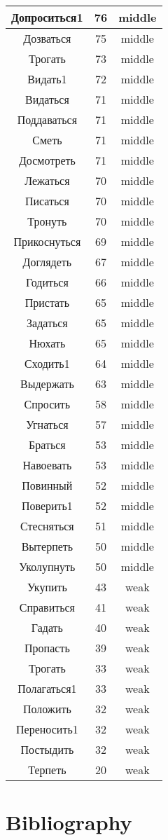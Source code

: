 \documentclass[a4paper,12pt]{article}
\begin{document}
\begin{longtable}{|c|c|c|}
		Допроситься1 & 76 & middle \\ \hline
		Дозваться & 75 & middle \\ \hline
		Трогать & 73 & middle \\ \hline
		Видать1 & 72 & middle \\ \hline
		Видаться & 71 & middle \\ \hline
		Поддаваться & 71 & middle \\ \hline
		Сметь & 71 & middle \\ \hline
		Досмотреть & 71 & middle \\ \hline
		Лежаться & 70 & middle \\ \hline
		Писаться & 70 & middle \\ \hline
		Тронуть & 70 & middle \\ \hline
		Прикоснуться & 69 & middle \\ \hline
		Доглядеть & 67 & middle \\ \hline
		Годиться & 66 & middle \\ \hline
		Пристать & 65 & middle \\ \hline
		Задаться & 65 & middle \\ \hline
		Нюхать & 65 & middle \\ \hline
		Сходить1 & 64 & middle \\ \hline
		Выдержать & 63 & middle \\ \hline
		Спросить & 58 & middle \\ \hline
		Угнаться & 57 & middle \\ \hline
		Браться & 53 & middle \\ \hline
		Навоевать & 53 & middle \\ \hline
		Повинный & 52 & middle \\ \hline
		Поверить1 & 52 & middle \\ \hline
		Стесняться & 51 & middle \\ \hline
		Вытерпеть & 50 & middle \\ \hline
		Уколупнуть & 50 & middle \\ \hline
		Укупить & 43 & weak \\ \hline
		Справиться & 41 & weak \\ \hline
		Гадать & 40 & weak \\ \hline
		Пропасть & 39 & weak \\ \hline
		Трогать & 33 & weak \\ \hline
		Полагаться1 & 33 & weak \\ \hline
		Положить & 32 & weak \\ \hline
		Переносить1 & 32 & weak \\ \hline
		Постыдить & 32 & weak \\ \hline
		Терпеть & 20 & weak \\ \hline
	\end{longtable}\label{tab:apresyan} 

	\section{Bibliography}
	\printbibliography
	
\end{document}
